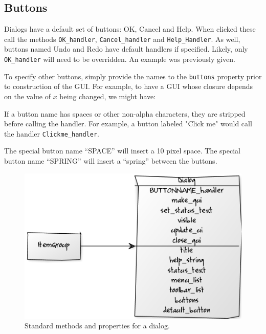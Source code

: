 \documentclass{article}
\newcommand{\code}[1]{\texttt{#1}} %
\newcommand{\generic}[1]{\code{#1}} %
\newcommand{\meth}[1]{\generic{#1}}     %
\newcommand{\property}[1]{\code{#1}}     %
\begin{document}
\subsection{Buttons}
\label{sec:buttons}

Dialogs have a default set of buttons: OK, Cancel and Help. When
clicked these call the methods \meth{OK\_handler},
\meth{Cancel\_handler} and \meth{Help\_Handler}. As well, buttons
named Undo and Redo have default handlers if specified. Likely, only
\meth{OK\_handler} will need to be overridden. An example was
previously given.

To specify other buttons, simply provide the names to the
\property{buttons} property prior to construction of the GUI. For example,
to have a GUI whose closure depends on the value of $x$ being changed,
we might have:
\begin{Schunk}
\end{Schunk}

If a button name has spaces or other non-alpha characters, they are
stripped before calling the handler. For example,  a button labeled "Click me"
would call the handler \meth{Clickme\_handler}.

The special button name ``SPACE'' will insert a 10 pixel space. The
special button name ``SPRING'' will insert a ``spring'' between the buttons.



\begin{figure}
  \centering
  \includegraphics[]{uml-dialog}
  \caption{Standard methods and properties for a dialog.}
  \label{fig:uml-dialog}
\end{figure}
\end{document}
